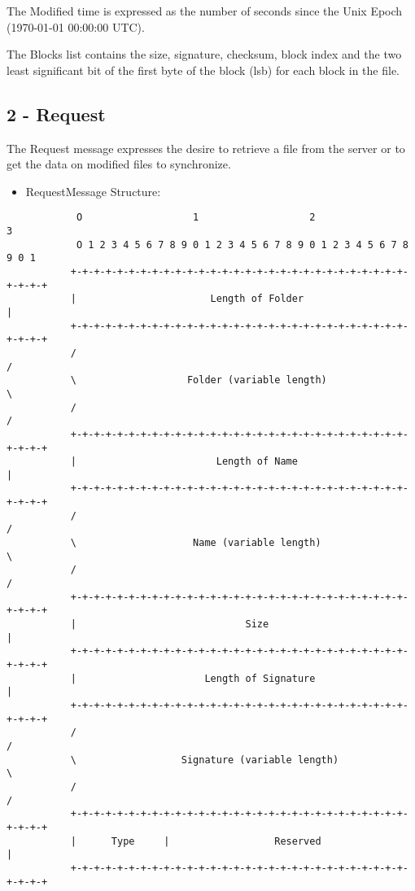 The Modified time is expressed as the number of seconds since the Unix
Epoch (1970-01-01 00:00:00 UTC).

The Blocks list contains the size, signature, checksum, block index
and the two least significant bit of the first byte of the block (lsb)
for each block in the file.

\subsection{2 - Request}

The Request message expresses the desire to retrieve a file from the
server or to get the data on modified files to synchronize.

\begin{itemize}
 \item RequestMessage Structure:
\end{itemize}

\begin{verbatim}
            O                   1                   2                   3
            O 1 2 3 4 5 6 7 8 9 0 1 2 3 4 5 6 7 8 9 0 1 2 3 4 5 6 7 8 9 0 1
           +-+-+-+-+-+-+-+-+-+-+-+-+-+-+-+-+-+-+-+-+-+-+-+-+-+-+-+-+-+-+-+-+
           |                       Length of Folder                        |
           +-+-+-+-+-+-+-+-+-+-+-+-+-+-+-+-+-+-+-+-+-+-+-+-+-+-+-+-+-+-+-+-+
           /                                                               /
           \                   Folder (variable length)                    \
           /                                                               /
           +-+-+-+-+-+-+-+-+-+-+-+-+-+-+-+-+-+-+-+-+-+-+-+-+-+-+-+-+-+-+-+-+
           |                        Length of Name                         |
           +-+-+-+-+-+-+-+-+-+-+-+-+-+-+-+-+-+-+-+-+-+-+-+-+-+-+-+-+-+-+-+-+
           /                                                               /
           \                    Name (variable length)                     \
           /                                                               /
           +-+-+-+-+-+-+-+-+-+-+-+-+-+-+-+-+-+-+-+-+-+-+-+-+-+-+-+-+-+-+-+-+
           |                             Size                              |
           +-+-+-+-+-+-+-+-+-+-+-+-+-+-+-+-+-+-+-+-+-+-+-+-+-+-+-+-+-+-+-+-+
           |                      Length of Signature                      |
           +-+-+-+-+-+-+-+-+-+-+-+-+-+-+-+-+-+-+-+-+-+-+-+-+-+-+-+-+-+-+-+-+
           /                                                               /
           \                  Signature (variable length)                  \
           /                                                               /
           +-+-+-+-+-+-+-+-+-+-+-+-+-+-+-+-+-+-+-+-+-+-+-+-+-+-+-+-+-+-+-+-+
           |      Type     |                  Reserved                     |
           +-+-+-+-+-+-+-+-+-+-+-+-+-+-+-+-+-+-+-+-+-+-+-+-+-+-+-+-+-+-+-+-+
\end{verbatim}

